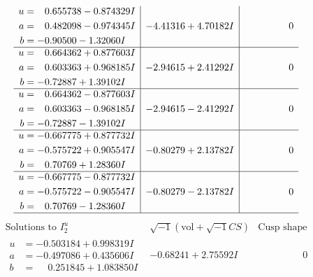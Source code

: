 \documentclass[1p]{elsarticle_modified}
\theoremstyle{definition}
\newcommand{\I}{\sqrt{-1}}
\begin{document}
$$\begin{array}{c|c|c}
\begin{aligned}
u &= \phantom{-}0.655738 - 0.874329 I \\
a &= \phantom{-}0.482098 - 0.974345 I \\
b &= -0.90500 - 1.32060 I\end{aligned}
 & -4.41316 + 4.70182 I & \phantom{-0.000000 } 0 \\ \hline\begin{aligned}
u &= \phantom{-}0.664362 + 0.877603 I \\
a &= \phantom{-}0.603363 + 0.968185 I \\
b &= -0.72887 + 1.39102 I\end{aligned}
 & -2.94615 + 2.41292 I & \phantom{-0.000000 } 0 \\ \hline\begin{aligned}
u &= \phantom{-}0.664362 - 0.877603 I \\
a &= \phantom{-}0.603363 - 0.968185 I \\
b &= -0.72887 - 1.39102 I\end{aligned}
 & -2.94615 - 2.41292 I & \phantom{-0.000000 } 0 \\ \hline\begin{aligned}
u &= -0.667775 + 0.877732 I \\
a &= -0.575722 + 0.905547 I \\
b &= \phantom{-}0.70769 + 1.28360 I\end{aligned}
 & -0.80279 + 2.13782 I & \phantom{-0.000000 } 0 \\ \hline\begin{aligned}
u &= -0.667775 - 0.877732 I \\
a &= -0.575722 - 0.905547 I \\
b &= \phantom{-}0.70769 - 1.28360 I\end{aligned}
 & -0.80279 - 2.13782 I & \phantom{-0.000000 } 0\\
 \hline 
 \end{array}$$\newpage$$\begin{array}{c|c|c}  
\text{Solutions to }I^u_{2}& \I (\text{vol} + \sqrt{-1}CS) & \text{Cusp shape}\\
 \hline 
\begin{aligned}
u &= -0.503184 + 0.998319 I \\
a &= -0.497086 + 0.435606 I \\
b &= \phantom{-}0.251845 + 1.083850 I\end{aligned}
 & -0.68241 + 2.75592 I & \phantom{-0.000000 } 0 \\ \hline\begin{aligned}

\end{aligned}
\end{array}$$
\end{document}
